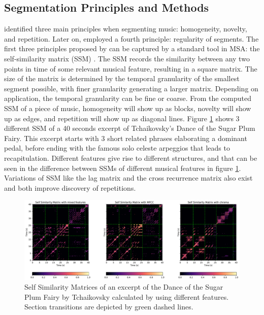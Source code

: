 
\subsection{Segmentation Principles and Methods}

\cite{paulus2010audio} identified three main principles when segmenting music: homogeneity, novelty, and repetition.
Later on, \cite{sargent2011regularity} employed a fourth principle: regularity of segments.
The first three principles proposed by \citeauthor{paulus2010audio} can be captured by a standard tool in MSA: the self-similarity matrix (SSM) \citep{foote1999visualizing}.
The SSM records the similarity between any two points in time of some relevant musical feature, resulting in a square matrix.
The size of the matrix is determined by the temporal granularity of the smallest segment possible, with finer granularity generating a larger matrix.
Depending on application, the temporal granularity can be fine or coarse.
From the computed SSM of a piece of music, homogeneity will show up as blocks, novelty will show up as edges, and repetition will show up as diagonal lines.
Figure \ref{fig:ssm} shows 3 different SSM of a 40 seconds excerpt of Tchaikovsky's Dance of the Sugar Plum Fairy.
This excerpt starts with 3 short related phrases elaborating a dominant pedal, before ending with the famous solo celeste arpeggios that leads to recapitulation.
Different features give rise to different structures, and that can be seen in the difference between SSMs of different musical features in figure \ref{fig:ssm}.
Variations of SSM like the lag matrix \citep{goto2003lag} and the cross recurrence matrix \citep{serra2009cross} also exist and both improve discovery of repetitions.
\begin{figure}[H]
    \centering
    \includegraphics[width=\textwidth]{ssm.pdf}
    \caption{Self Similarity Matrices of an excerpt of the Dance of the Sugar Plum Fairy by Tchaikovsky calculated by using different features. Section transitions are depicted by green dashed lines.}
    \label{fig:ssm}
\end{figure}

